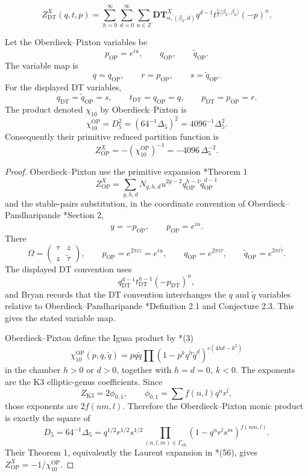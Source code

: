 \documentclass[11pt]{memoir}
\begin{document}
$$Z^X_{\mathrm{DT}}(q,t,p)=
\sum_{h=0}^{\infty}\sum_{d=0}^{\infty}\sum_{n\in\mathbb{Z}}
\mathbf{DT}^X_{n,(\beta_h,d)}
q^{d-1}t^{\frac{1}{2}\langle\beta_h,\beta_h\rangle}(-p)^n.$$

\begin{proposition}
\label{prop:op-normalization}
Let the Oberdieck--Pixton variables be
$$p_{\mathrm{OP}}=e^{iu},\qquad q_{\mathrm{OP}},\qquad
\widetilde q_{\mathrm{OP}}.$$
The variable map is
$$q=q_{\mathrm{OP}},\qquad r=p_{\mathrm{OP}},\qquad
s=\widetilde q_{\mathrm{OP}}.$$
For the displayed DT variables,
$$q_{\mathrm{DT}}=\widetilde q_{\mathrm{OP}}=s,\qquad
t_{\mathrm{DT}}=q_{\mathrm{OP}}=q,\qquad
p_{\mathrm{DT}}=p_{\mathrm{OP}}=r.$$
The product denoted $\chi_{10}$ by Oberdieck--Pixton is
$$\chi_{10}^{\mathrm{OP}}
=D_5^2
=\left(64^{-1}\Delta_5\right)^2
=4096^{-1}\Delta_5^2.$$
Consequently their primitive reduced partition function is
$$Z^X_{\mathrm{OP}}=-\left(\chi_{10}^{\mathrm{OP}}\right)^{-1}
=-4096\,\Delta_5^{-2}.$$
\end{proposition}

\begin{proof}
Oberdieck--Pixton use the primitive expansion \cite{OB}*{Theorem 1}
$$
Z^X_{\mathrm{OP}}
=\sum_{g,h,d}N_{g,h,d}u^{2g-2}
q_{\mathrm{OP}}^{h-1}\widetilde q_{\mathrm{OP}}^{d-1}
$$
and the stable-pairs substitution, in the coordinate convention of
Oberdieck--Pandharipande \cite{OPand}*{Section 2},
$$y=-p_{\mathrm{OP}},\qquad p_{\mathrm{OP}}=e^{iu}.$$
There
$$
\Omega=\begin{pmatrix}\tau&z\\ z&\widetilde\tau\end{pmatrix},\qquad
p_{\mathrm{OP}}=e^{2\pi iz}=e^{iu},\qquad
q_{\mathrm{OP}}=e^{2\pi i\tau},\qquad
\widetilde q_{\mathrm{OP}}=e^{2\pi i\widetilde\tau}.
$$
The displayed DT convention uses
$$q_{\mathrm{DT}}^{d-1}t_{\mathrm{DT}}^{h-1}(-p_{\mathrm{DT}})^n,$$
and Bryan records that the DT convention interchanges the $q$ and
$\widetilde q$ variables relative to Oberdieck--Pandharipande
\cite{BRYAN}*{Definition 2.1 and Conjecture 2.3}.  This gives the stated
variable map.

Oberdieck--Pixton define the Igusa product by \cite{OB}*{(3)}
$$
\chi_{10}^{\mathrm{OP}}(p,q,\widetilde q)
=pq\widetilde q
\prod(1-p^kq^h\widetilde q^d)^{c(4hd-k^2)}
$$
in the chamber $h>0$ or $d>0$, together with $h=d=0,\ k<0$.  The
exponents are the K3 elliptic-genus coefficients.  Since
$$Z_{\mathrm{K3}}=2\phi_{0,1},\qquad
\phi_{0,1}=\sum f(n,l)q^nr^l,$$
those exponents are $2f(nm,l)$.  Therefore the Oberdieck--Pixton monic
product is exactly the square of
$$D_5=64^{-1}\Delta_5
=q^{1/2}r^{1/2}s^{1/2}
\prod_{(n,l,m)\in\Gamma_{\mathrm{eff}}}
(1-q^nr^ls^m)^{f(nm,l)}.$$
Their Theorem 1, equivalently the Laurent expansion in \cite{OB}*{(56)},
gives $Z^X_{\mathrm{OP}}=-1/\chi_{10}^{\mathrm{OP}}$.
\end{proof}
\end{document}
